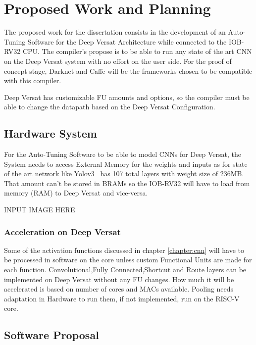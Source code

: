\chapter{Proposed Work and Planning}
\label{chapter:PWP}

\quad The proposed work for the dissertation consists in the development of an Auto-Tuning Software for the Deep Versat Architecture
while connected to the IOB-RV32 CPU.
The compiler's propose is to be able to run any state of the art CNN on the Deep Versat system with no effort on the user side. For the proof of concept
stage, Darknet and Caffe will be the frameworks chosen to be compatible with this compiler.

Deep Versat has customizable FU amounts and options, so the compiler must be able to change the datapath based on the Deep Versat Configuration.
  

\section{Hardware System}

\quad For the Auto-Tuning Software to be able to model CNNs for Deep Versat, the System needs to access External Memory for the weights and inputs as for state of the art network like 
Yolov3~\cite{yolov3} has 107 total layers with weight size of 236MB. That amount can't be stored in BRAMs so the IOB-RV32 will have
to load from memory (RAM) to Deep Versat and vice-versa.

INPUT IMAGE HERE 


\subsection{Acceleration on Deep Versat}

\quad Some of the activation functions discussed in chapter \ref{chapter:cnn} will have to be processed in software on the core unless
custom Functional Units are made for each function. Convolutional,Fully Connected,Shortcut and Route layers can be implemented on Deep Versat without
any FU changes. How much it will be accelerated is based on number of cores and MACs available. Pooling needs adaptation in Hardware to run them, if not implemented, run on the RISC-V core.


\newpage
\section{Software Proposal}


